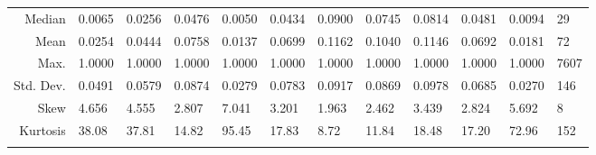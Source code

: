 \documentclass[11pt, a4paper]{article}
\begin{document}
\begin{table}[H]
{\begin{tabular}{|r|llllllllll!{\color{gray!50}\vrule}l|}
  Median & 0.0065 & 0.0256 & 0.0476 & 0.0050 & 0.0434 & 0.0900 & 0.0745 & 0.0814 & 0.0481 & 0.0094 &   29 \\
  Mean & 0.0254 & 0.0444 & 0.0758 & 0.0137 & 0.0699 & 0.1162 & 0.1040 & 0.1146 & 0.0692 & 0.0181 &   72 \\
  Max. & 1.0000 & 1.0000 & 1.0000 & 1.0000 & 1.0000 & 1.0000 & 1.0000 & 1.0000 & 1.0000 & 1.0000 & 7607 \\
  Std. Dev. & 0.0491 & 0.0579 & 0.0874 & 0.0279 & 0.0783 & 0.0917 & 0.0869 & 0.0978 & 0.0685 & 0.0270 &  146 \\
  Skew & 4.656 & 4.555 & 2.807 & 7.041 & 3.201 & 1.963 & 2.462 & 3.439 & 2.824 & 5.692 &    8 \\
  Kurtosis & 38.08 & 37.81 & 14.82 & 95.45 & 17.83 & 8.72 & 11.84 & 18.48 & 17.20 & 72.96 &  152 \\
\hline
\end{tabular}}
\end{table}
\end{document}
